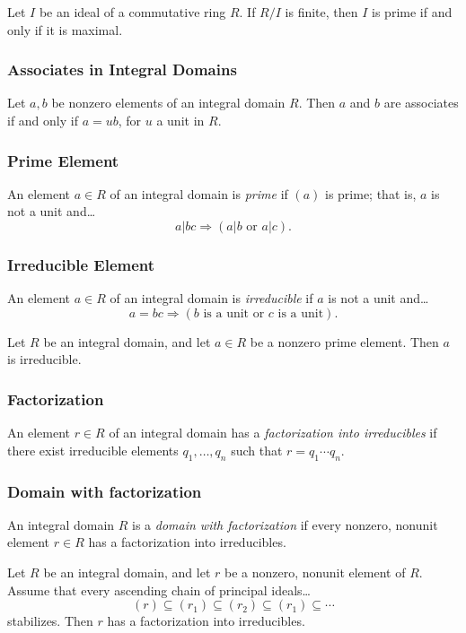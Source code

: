 \begin{corollary}
Let $I$ be an ideal of a commutative ring $R$. If $R/I$ is finite, then $I$ is prime if and only if it is maximal.
\end{corollary}

\subsubsection{Associates in Integral Domains}

\begin{lemma}
Let $a,b$ be nonzero elements of an integral domain $R$. Then $a$ and $b$ are associates if and only if $a = ub$, for
$u$ a unit in $R$.
\end{lemma}

\subsubsection{Prime Element}\label{primeelement}
An element $a \in R$ of an integral domain is \emph{prime} if $(a)$ is prime; that is, $a$ is not a unit and\dots
$$a | bc \Rightarrow (a|b \textrm{ or } a|c).$$

\subsubsection{Irreducible Element}\label{irreducibleelement}
An element $a \in R$ of an integral domain is \emph{irreducible} if $a$ is not a unit and\dots
$$a = bc \Rightarrow (b \textrm{ is a unit or } c \textrm{ is a unit}).$$

\begin{lemma}
Let $R$ be an integral domain, and let $a \in R$ be a nonzero prime element. Then $a$ is irreducible.
\end{lemma}

\subsubsection{Factorization}\label{factorization}
An element $r \in R$ of an integral domain has a \emph{factorization into irreducibles} if there exist irreducible elements $q_1, \dots, q_n$
such that $r = q_1 \cdots q_n$.

\subsubsection{Domain with factorization}\label{domainfactorization}
An integral domain $R$ is a \emph{domain with factorization} if every nonzero, nonunit element $r \in R$ has a factorization into irreducibles.

\begin{proposition}
\label{acc}
Let $R$ be an integral domain, and let $r$ be a nonzero, nonunit element of $R$. Assume that every ascending chain of principal ideals\dots
$$(r) \subseteq (r_1) \subseteq (r_2) \subseteq (r_1) \subseteq \cdots$$
stabilizes. Then $r$ has a factorization into irreducibles.
\end{proposition}
